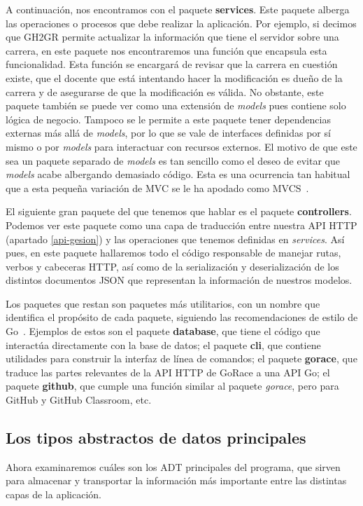 A continuación, nos encontramos con el paquete \textbf{services}. Este paquete alberga las operaciones o procesos que debe realizar la aplicación. Por ejemplo, si decimos que GH2GR permite actualizar la información que tiene el servidor sobre una carrera, en este paquete nos encontraremos una función que encapsula esta funcionalidad. Esta función se encargará de revisar que la carrera en cuestión existe, que el docente que está intentando hacer la modificación es dueño de la carrera y de asegurarse de que la modificación es válida. No obstante, este paquete también se puede ver como una extensión de \textit{models} pues contiene solo lógica de negocio. Tampoco se le permite a este paquete tener dependencias externas más allá de \textit{models}, por lo que se vale de interfaces definidas por sí mismo o por \textit{models} para interactuar con recursos externos. El motivo de que este sea un paquete separado de \textit{models} es tan sencillo como el deseo de evitar que \textit{models} acabe albergando demasiado código. Esta es una ocurrencia tan habitual que a esta pequeña variación de \acrshort{MVC} se le ha apodado como \acrshort{MVCS}~\cite{mvcs}.

El siguiente gran paquete del que tenemos que hablar es el paquete \textbf{controllers}. Podemos ver este paquete como una capa de traducción entre nuestra \acrshort{API} \acrshort{HTTP} (apartado \ref{api-gesion}) y las operaciones que tenemos definidas en \textit{services}. Así pues, en este paquete hallaremos todo el código responsable de manejar rutas, verbos y cabeceras \acrshort{HTTP}, así como de la serialización y deserialización de los distintos documentos \acrshort{JSON} que representan la información de nuestros modelos.

Los paquetes que restan son paquetes más utilitarios, con un nombre que identifica el propósito de cada paquete, siguiendo las recomendaciones de estilo de Go~\cite{goPackageNames}. Ejemplos de estos son el paquete \textbf{database}, que tiene el código que interactúa directamente con la base de datos; el paquete \textbf{cli}, que contiene utilidades para construir la interfaz de línea de comandos; el paquete \textbf{gorace}, que traduce las partes relevantes de la \acrshort{API} \acrshort{HTTP} de GoRace a una \acrshort{API} Go; el paquete \textbf{github}, que cumple una función similar al paquete \textit{gorace}, pero para GitHub y GitHub Classroom, etc.

\subsection{Los tipos abstractos de datos principales}
Ahora examinaremos cuáles son los \acrshort{ADT} principales del programa, que sirven para almacenar y transportar la información más importante entre las distintas capas de la aplicación.

